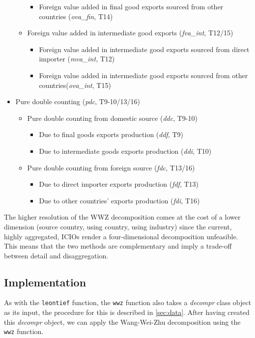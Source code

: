 \documentclass[a4paper,11pt]{article}
\begin{document}
\begin{itemize}
\begin{itemize}
\begin{itemize}
\item Foreign value added in final good exports sourced from other countries (\textit{ova\_fin}, T14)
\end{itemize}
\item Foreign value added in intermediate good exports (\textit{fva\_int}, T12/15)
\begin{itemize}
\item Foreign value added in intermediate good exports sourced from direct importer (\textit{mva\_int}, T12)
\item Foreign value added in intermediate good exports sourced from other countries(\textit{ova\_int}, T15)
\end{itemize}
\end{itemize}
\item Pure double counting (\textit{pdc}, T9-10/13/16)
\begin{itemize}
\item Pure double counting from domestic source (\textit{ddc}, T9-10)
\begin{itemize}
\item Due to final goods exports production (\textit{ddf}, T9)
\item Due to intermediate goods exports production (\textit{ddi}, T10)
\end{itemize}
\item Pure double counting from foreign source (\textit{fdc}, T13/16)
\begin{itemize}
\item Due to direct importer exports production (\textit{fdf}, T13)
\item Due to other countries' exports production (\textit{fdi}, T16)
\end{itemize}
\end{itemize}
\end{itemize}

The higher resolution of the WWZ decomposition comes at the cost of a lower dimension (source country, using country, using industry) since the current, highly aggregated, ICIOs render a four-dimensional decomposition unfeasible.
This means that the two methods are complementary and imply a trade-off between detail and disaggregation.

\subsection{Implementation}
As with the \verb!leontief! function, 
the \verb!wwz! function also takes a \textit{decompr} class object as its input, 
the procedure for this is described in \cref{sec:data}.
After having created this \textit{decompr} object, 
we can apply the Wang-Wei-Zhu decomposition using the \verb!wwz! function.
\end{document}
